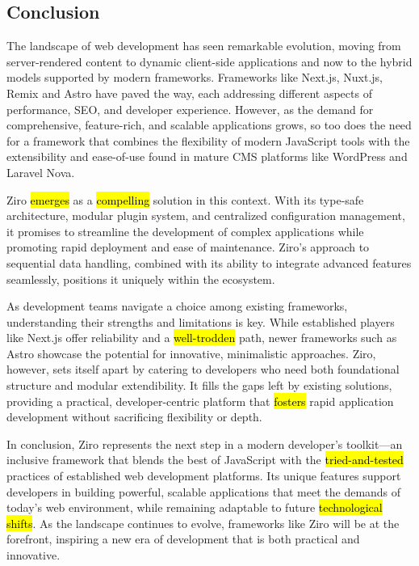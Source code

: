 \subsection{Conclusion}

The landscape of web development has seen remarkable evolution, moving from server-rendered content to dynamic client-side applications and now to the hybrid models supported by modern frameworks. Frameworks like Next.js, Nuxt.js, Remix and Astro have paved the way, each addressing different aspects of performance, SEO, and developer experience. However, as the demand for comprehensive, feature-rich, and scalable applications grows, so too does the need for a framework that combines the flexibility of modern JavaScript tools with the extensibility and ease-of-use found in mature CMS platforms like WordPress and Laravel Nova.

Ziro \hl{emerges} as a \hl{compelling} solution in this context. With its type-safe architecture, modular plugin system, and centralized configuration management, it promises to streamline the development of complex applications while promoting rapid deployment and ease of maintenance. Ziro’s approach to sequential data handling, combined with its ability to integrate advanced features seamlessly, positions it uniquely within the ecosystem.

As development teams navigate a choice among existing frameworks, understanding their strengths and limitations is key. While established players like Next.js offer reliability and a \hl{well-trodden} path, newer frameworks such as Astro showcase the potential for innovative, minimalistic approaches. Ziro, however, sets itself apart by catering to developers who need both foundational structure and modular extendibility. It fills the gaps left by existing solutions, providing a practical, developer-centric platform that \hl{fosters} rapid application development without sacrificing flexibility or depth.

In conclusion, Ziro represents the next step in a modern developer's toolkit—an inclusive framework that blends the best of JavaScript with the \hl{tried-and-tested} practices of established web development platforms. Its unique features support developers in building powerful, scalable applications that meet the demands of today's web environment, while remaining adaptable to future \hl{technological shifts}. As the landscape continues to evolve, frameworks like Ziro will be at the forefront, inspiring a new era of development that is both practical and innovative.

\pagebreak
